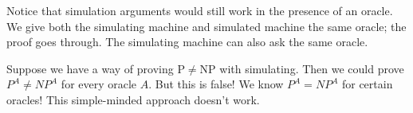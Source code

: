 Notice that simulation arguments would still work in the presence of an oracle. We give both the simulating machine and simulated machine the same oracle; the proof goes through. The simulating machine can also ask the same oracle. %

Suppose we have a way of proving P$\ne$NP with simulating. Then we could prove $P^A\ne NP^A$ for every oracle $A$. But this is false! We know $P^A=NP^A$ for certain oracles! This simple-minded approach doesn't work.\\

